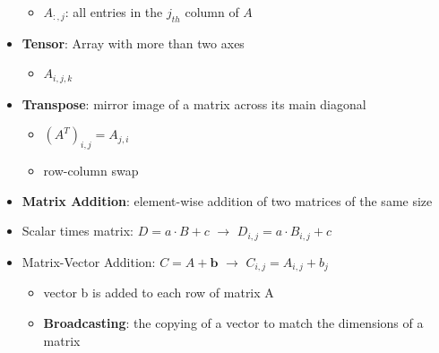 \begin{itemize}
\begin{itemize}
        \item $A_{:, j}$: all entries in the $j_{th}$ column of $A$
    \end{itemize}
    \item \textbf{Tensor}: Array with more than two axes
    \begin{itemize}
        \item $A_{i, j, k}$
    \end{itemize}
    \item \textbf{Transpose}: mirror image of a matrix across its main diagonal
    \begin{itemize}
        \item $(A^T)_{i,j} = A_{j, i}$
        \item row-column swap
    \end{itemize}
    \item \textbf{Matrix Addition}: element-wise addition of two matrices of the same size
    \item Scalar times matrix: $D = a \cdot B + c$ $\rightarrow$ $D_{i,j} = a \cdot B_{i,j} + c$ 
    \item Matrix-Vector Addition: $C = A + \mathbf{b}$ $\rightarrow$  $C_{i, j} = A_{i, j} + b_j$
    \begin{itemize}
        \item vector b is added to each row of matrix A
        \item \textbf{Broadcasting}: the copying of a vector to match the dimensions of a matrix
    \end{itemize}
\end{itemize}

